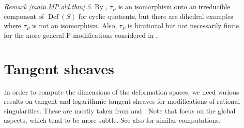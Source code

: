 \documentclass{amsart}
\theoremstyle{definition}
\theoremstyle{remark}
\newcommand{\defsp}[0]{\operatorname{Def}}
\begin{document}
\medskip
{\it Remark \ref{main.MP.old.thm}.5.} By  \cite{MR1129040},  $\tau^{}_{P}$
is  an isomorphism onto an irreducible component of $\defsp(S)$ for cyclic quotients, but
there are dihedral examples where $\tau^{}_{P}$
is  not an isomorphism.
Also, $\tau^{}_{P}$ is birational but not necessarily finite
 for the more general 
P-modifications considered in \cite[Sec.6]{k-etc}.



\section{Tangent sheaves}


In order to compute the dimensions of the deformation spaces, 
we need various results on  tangent and logarithmic tangent sheaves for
modifications of rational singularities. These are mostly taken from
\cite{MR367277, MR333238} and 
\cite{lee-park, MR2995167}.  Note that \cite{lee-park, MR2995167} focus on the global aspects, which tend to be more subtle. 
See also \cite{pa-pa-sh-2, MR4509033, MR4502069} for similar computations. 
\end{document}
